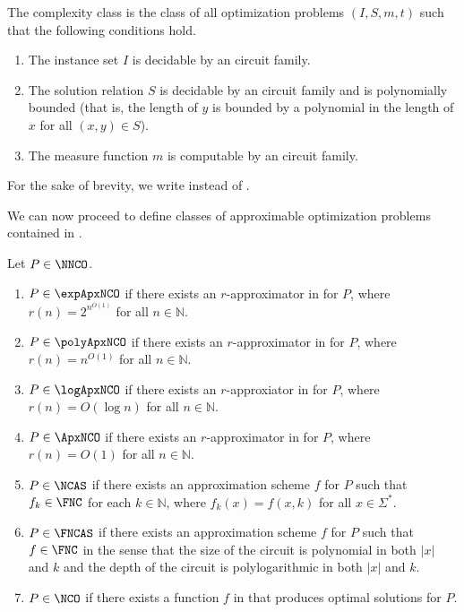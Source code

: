 \documentclass[]{article}
\begin{document}
\begin{definition}\label{def:nnco}
  The complexity class \NNCOpoly{} is the class of all optimization problems $(I, S, m, t)$ such that the following conditions hold.
  \begin{enumerate}
  \item The instance set $I$ is decidable by an \NC{} circuit family.
  \item The solution relation $S$ is decidable by an \NC{} circuit family and is polynomially bounded (that is, the length of $y$ is bounded by a polynomial in the length of $x$ for all $(x, y)\in S$).
  \item The measure function $m$ is computable by an \FNC{} circuit family.
  \end{enumerate}
  For the sake of brevity, we write \NNCO{} instead of \NNCOpoly{}.
\end{definition}

We can now proceed to define classes of approximable optimization problems contained in \NNCO.

\begin{definition}\label{def:ncx}
  Let $P\in\NNCO$.
  \begin{enumerate}
  \item $P\in\expApxNCO$ if there exists an $r$-approximator in \FNC{} for $P$, where $r(n)=2^{n^{O(1)}}$ for all $n\in\mathbb{N}$.
  \item $P\in\polyApxNCO$ if there exists an $r$-approximator in \FNC{} for $P$, where $r(n)=n^{O(1)}$ for all $n\in\mathbb{N}$.
  \item $P\in\logApxNCO$ if there exists an $r$-approxiator in \FNC{} for $P$, where $r(n)=O(\log n)$ for all $n\in\mathbb{N}$.
  \item $P\in\ApxNCO$ if there exists an $r$-approximator in \FNC{} for $P$, where $r(n)=O(1)$ for all $n\in\mathbb{N}$.
  \item $P\in\NCAS$ if there exists an approximation scheme $f$ for $P$ such that $f_k\in\FNC$ for each $k\in\mathbb{N}$, where $f_k(x)=f(x, k)$ for all $x\in\Sigma^*$.
  \item $P\in\FNCAS$ if there exists an approximation scheme $f$ for $P$ such that $f\in\FNC$ in the sense that the size of the circuit is polynomial in both $|x|$ and $k$ and the depth of the circuit is polylogarithmic in both $|x|$ and $k$.
  \item $P\in\NCO$ if there exists a function $f$ in \FNC{} that produces optimal solutions for $P$.
  \end{enumerate}
\end{definition}
\end{document}
